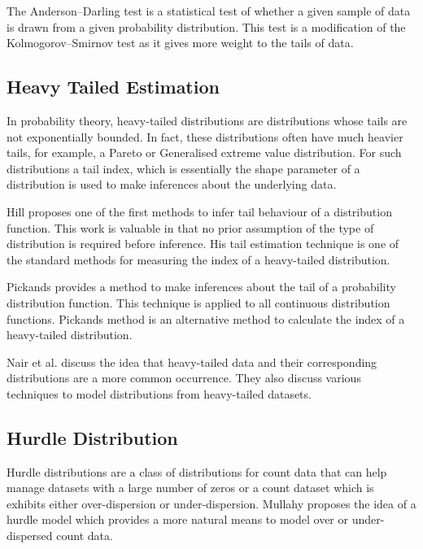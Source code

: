 The Anderson--Darling \cite{anderson1954test}\cite{anderson1952asymptotic} test is a statistical test of whether a given sample of data is drawn from a given probability distribution. This test is a modification of the Kolmogorov--Smirnov test as it gives more weight to the tails of data. 

\subsection{Heavy Tailed Estimation}

In probability theory, heavy-tailed distributions are distributions whose tails are not exponentially bounded. In fact, these distributions often have much heavier tails, for example, a Pareto or Generalised extreme value distribution. For such distributions a tail index, which is essentially the shape parameter of a distribution is used to make inferences about the underlying data. 

Hill\cite{hill1975simple} proposes one of the first methods to infer tail behaviour of a distribution function. This work is valuable in that no prior assumption of the type of distribution is required before inference. His tail estimation technique is one of the standard methods for measuring the index of a heavy-tailed distribution.

Pickands\cite{pickands1975statistical} provides a method to make inferences about the tail of a probability distribution function. This technique is applied to all continuous distribution functions. Pickands method is an alternative method to calculate the index of a heavy-tailed distribution.

Nair et al.\cite{nair2013fundamentals} discuss the idea that heavy-tailed data and their corresponding distributions are a more common occurrence. They also discuss various techniques to model distributions from heavy-tailed datasets.

\subsection{Hurdle Distribution}

Hurdle distributions are a class of distributions for count data that can help manage datasets with a large number of zeros or a count dataset which is exhibits either over-dispersion or under-dispersion. Mullahy\cite{mullahy1986specification} proposes the idea of a hurdle model which provides a more natural means to model over or under-dispersed count data. 

